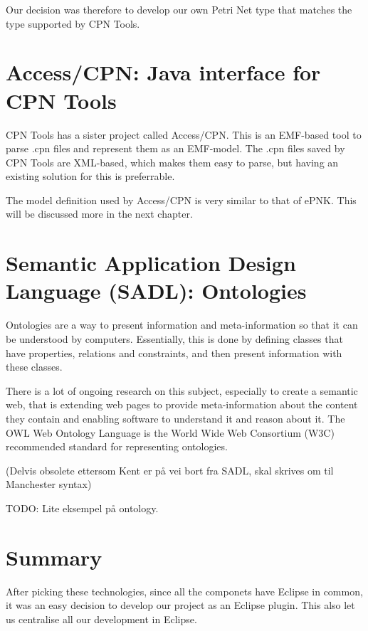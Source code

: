 Our decision was therefore to develop our own Petri Net type that matches the
type supported by CPN Tools.

\section{Access/CPN: Java interface for CPN Tools}
CPN Tools has a sister project called Access/CPN. This is an
EMF-based tool to parse .cpn files and represent them as an
EMF-model. The .cpn files saved by CPN Tools are XML-based, which makes them
easy to parse, but having an existing solution for this is preferrable.

The model definition used by Access/CPN is very similar to that of ePNK. This
will be discussed more in the next chapter.

\section{Semantic Application Design Language (SADL): Ontologies}

Ontologies are a way to present information and meta-information so that it can
be understood by computers. Essentially, this is done by defining classes that
have properties, relations and constraints, and then present
information with these classes.

There is a lot of ongoing research on this subject, especially to create a
semantic web, that is extending web pages to provide meta-information about the
content they contain and enabling software to understand it and reason about it.
The OWL Web Ontology Language \cite{owl2-overview} is the World Wide Web Consortium (W3C)
recommended standard for representing ontologies.

(Delvis obsolete ettersom Kent er på vei bort fra SADL, skal skrives om til
Manchester syntax)

TODO: Lite eksempel på ontology.

\section{Summary}
After picking these technologies, since all the componets have Eclipse in
common, it was an easy decision to develop our project as an Eclipse plugin.
This also let us centralise all our development in Eclipse.
